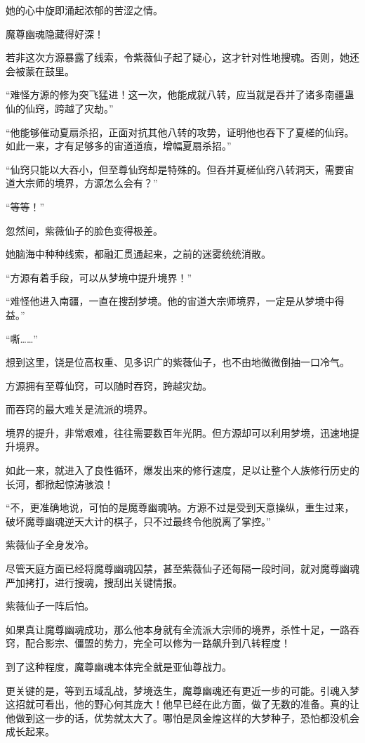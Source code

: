 \begin{this_body}
她的心中旋即涌起浓郁的苦涩之情。

魔尊幽魂隐藏得好深！

若非这次方源暴露了线索，令紫薇仙子起了疑心，这才针对性地搜魂。否则，她还会被蒙在鼓里。

“难怪方源的修为突飞猛进！这一次，他能成就八转，应当就是吞并了诸多南疆蛊仙的仙窍，跨越了灾劫。”

“他能够催动夏扇杀招，正面对抗其他八转的攻势，证明他也吞下了夏槎的仙窍。如此一来，才有足够多的宙道道痕，增幅夏扇杀招。”

“仙窍只能以大吞小，但至尊仙窍却是特殊的。但吞并夏槎仙窍八转洞天，需要宙道大宗师的境界，方源怎么会有？”

“等等！”

忽然间，紫薇仙子的脸色变得极差。

她脑海中种种线索，都融汇贯通起来，之前的迷雾统统消散。

“方源有着手段，可以从梦境中提升境界！”

“难怪他进入南疆，一直在搜刮梦境。他的宙道大宗师境界，一定是从梦境中得益。”

“嘶……”

想到这里，饶是位高权重、见多识广的紫薇仙子，也不由地微微倒抽一口冷气。

方源拥有至尊仙窍，可以随时吞窍，跨越灾劫。

而吞窍的最大难关是流派的境界。

境界的提升，非常艰难，往往需要数百年光阴。但方源却可以利用梦境，迅速地提升境界。

如此一来，就进入了良性循环，爆发出来的修行速度，足以让整个人族修行历史的长河，都掀起惊涛骇浪！

“不，更准确地说，可怕的是魔尊幽魂呐。方源不过是受到天意操纵，重生过来，破坏魔尊幽魂逆天大计的棋子，只不过最终令他脱离了掌控。”

紫薇仙子全身发冷。

尽管天庭方面已经将魔尊幽魂囚禁，甚至紫薇仙子还每隔一段时间，就对魔尊幽魂严加拷打，进行搜魂，搜刮出关键情报。

紫薇仙子一阵后怕。

如果真让魔尊幽魂成功，那么他本身就有全流派大宗师的境界，杀性十足，一路吞窍，配合影宗、僵盟的势力，完全可以修为一路飙升到八转程度！

到了这种程度，魔尊幽魂本体完全就是亚仙尊战力。

更关键的是，等到五域乱战，梦境迭生，魔尊幽魂还有更近一步的可能。引魂入梦这招就可看出，他的野心何其庞大！他早已经在此方面，做了无数的准备。真的让他做到这一步的话，优势就太大了。哪怕是凤金煌这样的大梦种子，恐怕都没机会成长起来。


\end{this_body}
